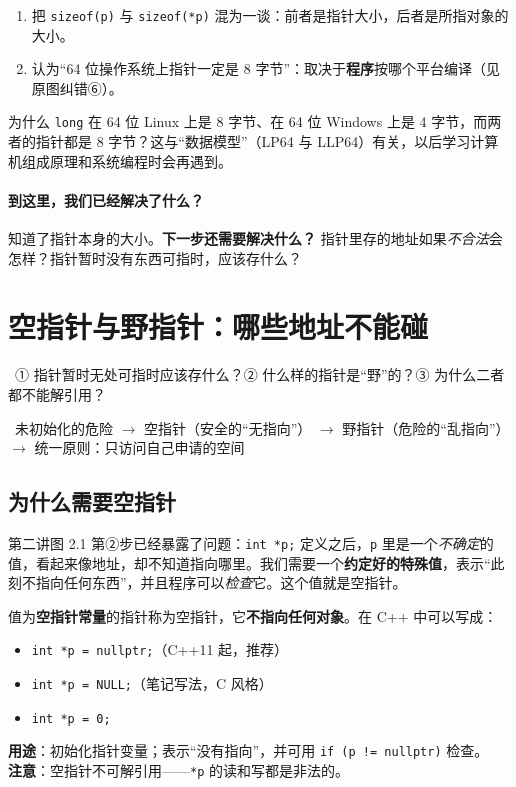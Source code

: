 \documentclass[UTF8,a4paper,11pt,fontset=none,zihao=-4]{ctexart}
\newcommand{\ci}[1]{{\circfont #1}}
\newcommand{\cpp}[1]{\lstinline[style=cpp,basicstyle=\ttfamily,numbers=none]{#1}}
\newcommand{\cc}[1]{\texttt{#1}}
\begin{document}
\begin{warningbox}
\begin{enumerate}
  \item 把 \cpp{sizeof(p)} 与 \cpp{sizeof(*p)} 混为一谈：前者是指针大小，后者是所指对象的大小。
  \item 认为“64 位操作系统上指针一定是 8 字节”：取决于\textbf{程序}按哪个平台编译（见原图纠错\ci{⑥}）。
\end{enumerate}
\end{warningbox}

\begin{extendbox}
为什么 \cc{long} 在 64 位 Linux 上是 8 字节、在 64 位 Windows 上是 4 字节，而两者的指针都是 8 字节？这与“数据模型”（LP64 与 LLP64）有关，以后学习计算机组成原理和系统编程时会再遇到。
\end{extendbox}

\paragraph{到这里，我们已经解决了什么？} 知道了指针本身的大小。\textbf{下一步还需要解决什么？} 指针里存的地址如果\emph{不合法}会怎样？指针暂时没有东西可指时，应该存什么？

\section{空指针与野指针：哪些地址不能碰}\label{sec:null}
\ \ci{①} 指针暂时无处可指时应该存什么？\ci{②} 什么样的指针是“野”的？\ci{③} 为什么二者都不能解引用？\par
{}\ 未初始化的危险 $\to$ 空指针（安全的“无指向”） $\to$ 野指针（危险的“乱指向”） $\to$ 统一原则：只访问自己申请的空间

\subsection{为什么需要空指针}
第二讲图 2.1 第\ci{②}步已经暴露了问题：\cpp{int *p;} 定义之后，\cc{p} 里是一个\emph{不确定}的值，看起来像地址，却不知道指向哪里。我们需要一个\textbf{约定好的特殊值}，表示“此刻不指向任何东西”，并且程序可以\emph{检查}它。这个值就是空指针。

\begin{definitionbox}[空指针]
值为\textbf{空指针常量}的指针称为空指针，它\textbf{不指向任何对象}。在 C++ 中可以写成：
\begin{itemize}[itemsep=0pt]
  \item \cc{int *p = nullptr;}\quad （C++11 起，推荐）
  \item \cc{int *p = NULL;}\quad （笔记写法，C 风格）
  \item \cc{int *p = 0;}
\end{itemize}
\textbf{用途}：初始化指针变量；表示“没有指向”，并可用 \cpp{if (p != nullptr)} 检查。\\
\textbf{注意}：空指针不可解引用——\cc{*p} 的读和写都是非法的。
\end{definitionbox}
\end{document}
